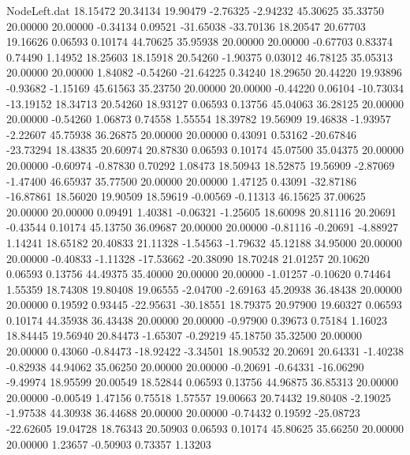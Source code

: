 \begin{filecontents}{NodeLeft.dat}
  18.15472   20.34134   19.90479    -2.76325   -2.94232   45.30625   35.33750   20.00000   20.00000   -0.34134    0.09521  -31.65038  -33.70136
  18.20547   20.67703   19.16626     0.06593    0.10174   44.70625   35.95938   20.00000   20.00000   -0.67703    0.83374    0.74490    1.14952
  18.25603   18.15918   20.54260    -1.90375    0.03012   46.78125   35.05313   20.00000   20.00000    1.84082   -0.54260  -21.64225    0.34240
  18.29650   20.44220   19.93896    -0.93682   -1.15169   45.61563   35.23750   20.00000   20.00000   -0.44220    0.06104  -10.73034  -13.19152
  18.34713   20.54260   18.93127     0.06593    0.13756   45.04063   36.28125   20.00000   20.00000   -0.54260    1.06873    0.74558    1.55554
  18.39782   19.56909   19.46838    -1.93957   -2.22607   45.75938   36.26875   20.00000   20.00000    0.43091    0.53162  -20.67846  -23.73294
  18.43835   20.60974   20.87830     0.06593    0.10174   45.07500   35.04375   20.00000   20.00000   -0.60974   -0.87830    0.70292    1.08473
  18.50943   18.52875   19.56909    -2.87069   -1.47400   46.65937   35.77500   20.00000   20.00000    1.47125    0.43091  -32.87186  -16.87861
  18.56020   19.90509   18.59619    -0.00569   -0.11313   46.15625   37.00625   20.00000   20.00000    0.09491    1.40381   -0.06321   -1.25605
  18.60098   20.81116   20.20691    -0.43544    0.10174   45.13750   36.09687   20.00000   20.00000   -0.81116   -0.20691   -4.88927    1.14241
  18.65182   20.40833   21.11328    -1.54563   -1.79632   45.12188   34.95000   20.00000   20.00000   -0.40833   -1.11328  -17.53662  -20.38090
  18.70248   21.01257   20.10620     0.06593    0.13756   44.49375   35.40000   20.00000   20.00000   -1.01257   -0.10620    0.74464    1.55359
  18.74308   19.80408   19.06555    -2.04700   -2.69163   45.20938   36.48438   20.00000   20.00000    0.19592    0.93445  -22.95631  -30.18551
  18.79375   20.97900   19.60327     0.06593    0.10174   44.35938   36.43438   20.00000   20.00000   -0.97900    0.39673    0.75184    1.16023
  18.84445   19.56940   20.84473    -1.65307   -0.29219   45.18750   35.32500   20.00000   20.00000    0.43060   -0.84473  -18.92422   -3.34501
  18.90532   20.20691   20.64331    -1.40238   -0.82938   44.94062   35.06250   20.00000   20.00000   -0.20691   -0.64331  -16.06290   -9.49974
  18.95599   20.00549   18.52844     0.06593    0.13756   44.96875   36.85313   20.00000   20.00000   -0.00549    1.47156    0.75518    1.57557
  19.00663   20.74432   19.80408    -2.19025   -1.97538   44.30938   36.44688   20.00000   20.00000   -0.74432    0.19592  -25.08723  -22.62605
  19.04728   18.76343   20.50903     0.06593    0.10174   45.80625   35.66250   20.00000   20.00000    1.23657   -0.50903    0.73357    1.13203

\end{filecontents}
